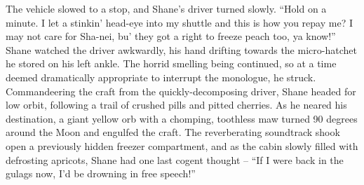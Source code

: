 The vehicle slowed to a stop, and Shane’s driver turned slowly. ``Hold on a minute. I let a stinkin’ head-eye into my shuttle and this is how you repay me? I may not care for Sha-nei, bu’ they got a right to freeze peach too, ya know!'' Shane watched the driver awkwardly, his hand drifting towards the micro-hatchet he stored on his left ankle. The horrid smelling being continued, so at a time deemed dramatically appropriate to interrupt the monologue, he struck. Commandeering the craft from the quickly-decomposing driver, Shane headed for low orbit, following a trail of crushed pills and pitted cherries. As he neared his destination, a giant yellow orb with a chomping, toothless maw turned 90 degrees around the Moon and engulfed the craft. The reverberating soundtrack shook open a previously hidden freezer compartment, and as the cabin slowly filled with defrosting apricots, Shane had one last cogent thought – ``If I were back in the gulags now, I’d be drowning in free speech!”